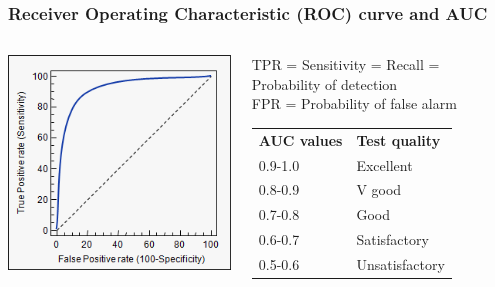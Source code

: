\documentclass{beamer}
\begin{document}
\begin{frame}\frametitle{Receiver Operating Characteristic (ROC) curve and AUC}
	\begin{columns}
		\begin{column}{0.5\paperwidth}
			\includegraphics[scale=0.5]{roc}
		\end{column}
		\begin{column}{0.5\paperwidth}
			TPR = Sensitivity = Recall = Probability of detection\\
			FPR = Probability of false alarm\\
			\begin{table}
				\begin{tabular}{l|l}
					\textbf{AUC values} & \textbf{Test quality}\\
					0.9-1.0 & Excellent\\
					0.8-0.9 & V good\\
					0.7-0.8 & Good\\
					0.6-0.7 & Satisfactory\\
					0.5-0.6 & Unsatisfactory\\
				\end{tabular}
			\end{table}
		\end{column}
	\end{columns}
\end{frame}
\end{document}
